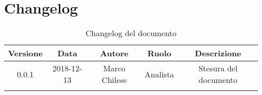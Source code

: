\newpage

\section{Changelog}

\begin{center}
\begin{longtable}{|c|c|c|c|c|}
\hline
\textbf{Versione} & \textbf{Data} & \textbf{Autore} & \textbf{Ruolo} & \textbf{Descrizione} \\
\hline \hline
\endfirsthead
0.0.1 & 2018-12-13 & Marco Chilese& Analista & Stesura del documento \\
\hline
\caption{Changelog del documento}
\end{longtable}
\end{center}
